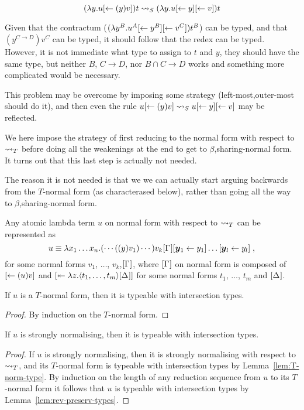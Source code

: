 \documentclass[orivec]{llncs}
\begin{document}
\[(\lambda y. u\share*{}{(y)v})t\ALnotbeta(\lambda y. u\share*{}{y}\share*{}{v})t\]

Given that the contractum ($(\lambda y^B. u^A\share*{}{y^B}\share*{}{v^C})t^B$) can be typed, and that $(y^{C\rightarrow D})v^C$ can be typed, it should follow that the redex can be typed. However, it is not immediate what type to assign to $t$ and $y$, they should have the same type, but neither $B$, $C\rightarrow D$, nor $B\cap C\rightarrow D$ works and something more complicated would be necessary.

This problem may be overcome by imposing some strategy (left-most,outer-most should do it), and then even the rule $u\share*{}{(y)v}\ALnotbeta u\share*{}{y}\share*{}{v}$ may be reflected.

We here impose the strategy of first reducing to the normal form with respect to $\ALtype$ before doing all the weakenings at the end to get to $\beta$,sharing-normal form. It turns out that this last step is actually not needed.

The reason it is not needed is that we we can actually start arguing backwards from the $T$-normal form (as characterased below), rather than going all the way to $\beta$,sharing-normal form.

\begin{ALlemma}\label{lem:type-normal-form}
Any atomic lambda term $u$ on normal form with respect to $\ALtype$ can be represented as
\[
 u \equiv \lambda x_1\dots x_n.(\cdots((y) v_1)\cdots )v_k\G\share* {\vec y_1}{y_1}\dots\share* {\vec y_l}{y_l}\;,
\]
for some normal forms $v_1$, $\dots$, $v_k$,$\G$, where $\G$ on normal form is composed of $\share* {}{(u)v}$ and $\distr*{}z{\tup[m] t\G*}$ for some normal forms $t_1$, $\dots$, $t_m$ and $\G*$.
\end{ALlemma}

\begin{ALlemma}\label{lem:T-norm-type}
If $u$ is a $T$-normal form, then it is typeable with intersection types.
\end{ALlemma}

\begin{proof}
By induction on the $T$-normal form.
\end{proof}

\begin{ALtheorem}
If $u$ is strongly normalising, then it is typeable with intersection types.
\end{ALtheorem}

\begin{proof}
If $u$ is strongly normalising, then it is strongly normalising with respect to $\ALtype$, and its $T$-normal form is typeable with intersection types by Lemma~\ref{lem:T-norm-type}. By induction on the length of any reduction sequence from $u$ to its $T$-normal form it follows that $u$ is typeable with intersection types by Lemma~\ref{lem:rev-preserv-types}.
\end{proof}
\end{document}
